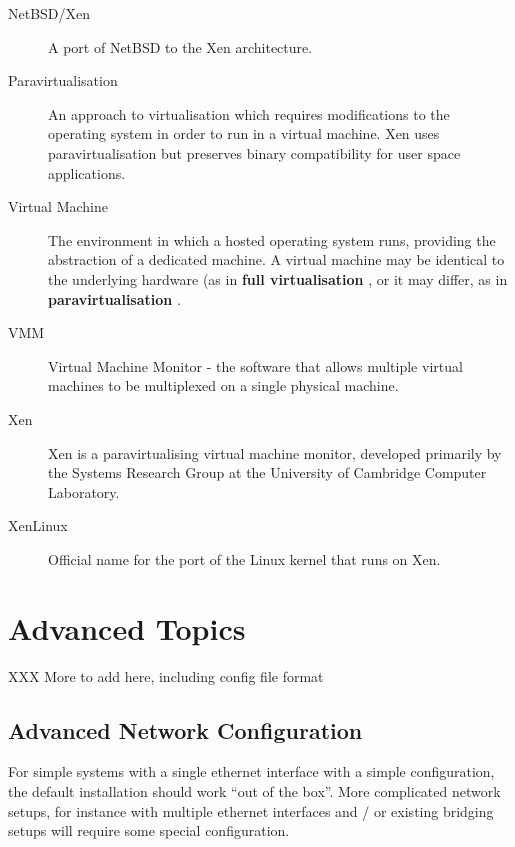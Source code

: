 \documentclass[11pt,twoside,final,openright]{xenstyle}
\begin{document}
\begin{description}
\item[NetBSD/Xen]          A port of NetBSD to the Xen architecture.

\item[Paravirtualisation]  An approach to virtualisation which requires
                           modifications to the operating system in
                           order to run in a virtual machine.  Xen
                           uses paravirtualisation but preserves
                           binary compatibility for user space
                           applications.

\item[Virtual Machine]     The environment in which a hosted operating
                           system runs, providing the abstraction of a
                           dedicated machine.  A virtual machine may
                           be identical to the underlying hardware (as
                           in { \bf full virtualisation }, or it may
                           differ, as in { \bf paravirtualisation }.

\item[VMM]                 Virtual Machine Monitor - the software that
                           allows multiple virtual machines to be
			   multiplexed on a single physical machine.

\item[Xen]                 Xen is a paravirtualising virtual machine
                           monitor, developed primarily by the
			   Systems Research Group at the University
			   of Cambridge Computer Laboratory.

\item[XenLinux]            Official name for the port of the Linux kernel
                           that runs on Xen.

\end{description}

\part{Advanced Topics}

XXX More to add here, including config file format

\chapter{Advanced Network Configuration}

For simple systems with a single ethernet interface with a simple
configuration, the default installation should work ``out of the
box''.  More complicated network setups, for instance with multiple
ethernet interfaces and / or existing bridging setups will require
some special configuration.
\end{document}
